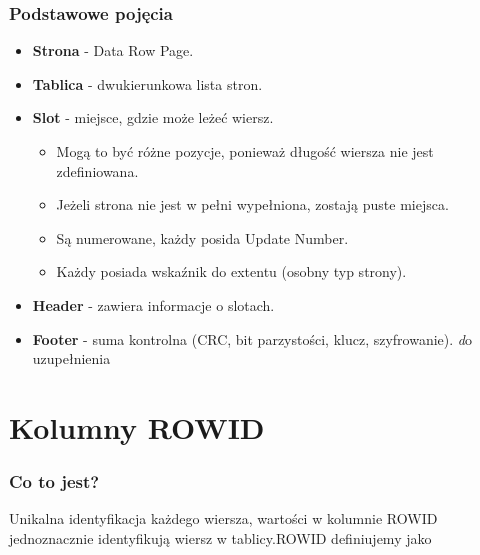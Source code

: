 \documentclass[a4paper,twoside]{article}
\begin{document}
  	\section*{Podstawowe pojęcia}
  	\begin{itemize}
  		\item \textbf{Strona} - Data Row Page.
  		\item \textbf{Tablica} - dwukierunkowa lista stron.
  		\item \textbf{Slot} - miejsce, gdzie może leżeć wiersz.
  		\begin{itemize}
  			\item Mogą to być różne pozycje, ponieważ długość wiersza nie jest zdefiniowana.
  			\item Jeżeli strona nie jest w pełni wypełniona, zostają puste miejsca.
  			\item Są numerowane, każdy posida Update Number.
  			\item Każdy posiada wskaźnik do extentu (osobny typ strony).
  		\end{itemize}
  		\item \textbf{Header} - zawiera informacje o slotach.
  		\item \textbf{Footer} - suma kontrolna (CRC, bit parzystości, klucz, szyfrowanie). \emph do uzupełnienia
  	\end{itemize}
  	
  	\part*{Kolumny ROWID}
  	\section*{Co to jest?}
  	Unikalna identyfikacja każdego wiersza, wartości w kolumnie ROWID jednoznacznie identyfikują wiersz w tablicy.ROWID definiujemy jako
  	
\end{document}
